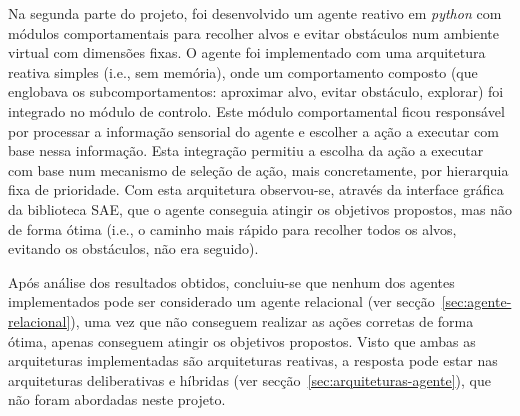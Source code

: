 Na segunda parte do projeto, foi desenvolvido um agente reativo em \textit{python} com módulos comportamentais para recolher alvos e evitar obstáculos num ambiente virtual com dimensões fixas.
O agente foi implementado com uma arquitetura reativa simples (i.e., sem memória), onde um comportamento composto (que englobava os subcomportamentos: aproximar alvo, evitar obstáculo, explorar) foi integrado no módulo de controlo.
Este módulo comportamental ficou responsável por processar a informação sensorial do agente e escolher a ação a executar com base nessa informação.
Esta integração permitiu a escolha da ação a executar com base num mecanismo de seleção de ação, mais concretamente, por hierarquia fixa de prioridade.
Com esta arquitetura observou-se, através da interface gráfica da biblioteca SAE, que o agente conseguia atingir os objetivos propostos, mas não de forma ótima (i.e., o caminho mais rápido para recolher todos os alvos, evitando os obstáculos, não era seguido).

Após análise dos resultados obtidos, concluiu-se que nenhum dos agentes implementados pode ser considerado um agente relacional (ver secção~\ref{sec:agente-relacional}), uma vez que não conseguem realizar as ações corretas de forma ótima, apenas conseguem atingir os objetivos propostos. Visto que ambas as arquiteturas implementadas são arquiteturas reativas, a resposta pode estar nas arquiteturas deliberativas e híbridas (ver secção~\ref{sec:arquiteturas-agente}), que não foram abordadas neste projeto.
